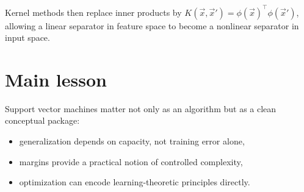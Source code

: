 Kernel methods then replace inner products by $K(\vec{x},\vec{x}') = \phi(\vec{x})^\top \phi(\vec{x}')$, allowing a linear separator in feature space to become a nonlinear separator in input space.

\section{Main lesson}

Support vector machines matter not only as an algorithm but as a clean conceptual package:
\begin{itemize}
  \item generalization depends on capacity, not training error alone,
  \item margins provide a practical notion of controlled complexity,
  \item optimization can encode learning-theoretic principles directly.
\end{itemize}
